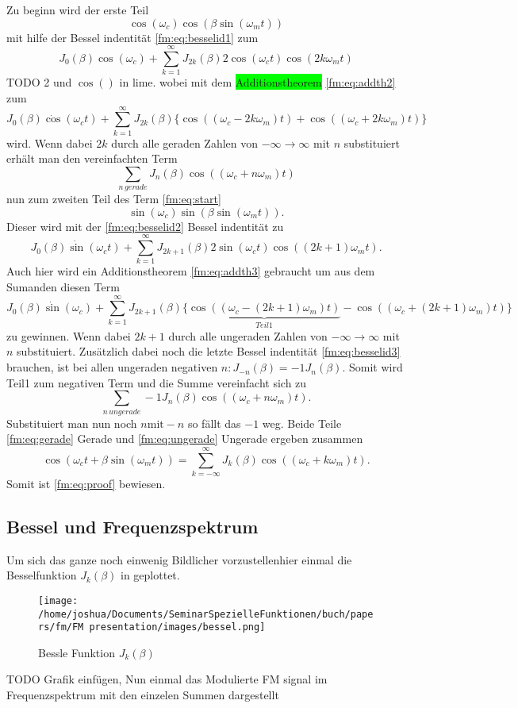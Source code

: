 Zu beginn wird der erste Teil 
\[
    \cos(\omega_c)\cos(\beta\sin(\omega_mt))  
\]
mit hilfe der Bessel indentität \ref{fm:eq:besselid1} zum
\[
    J_0(\beta)\cos(\omega_c) + \sum_{k=1}^\infty J_{2k}(\beta) 2\cos(\omega_c t)\cos(2k\omega_m t)
\]
\newline
TODO 2 und \(\cos( )\) in lime.
wobei mit dem \colorbox{lime}{Additionstheorem} \ref{fm:eq:addth2} zum
\[
    J_0(\beta)\dot \cos(\omega_c t) + \sum_{k=1}^\infty J_{2k}(\beta) \{ \cos((\omega_c - 2k\omega_m) t)+\cos((\omega_c + 2k\omega_m) t) \}
\]
wird.
Wenn dabei \(2k\) durch alle geraden Zahlen von \(-\infty \to \infty\) mit \(n\) substituiert erhält man den vereinfachten Term
\[
    \sum_{n\, gerade} J_{n}(\beta) \cos((\omega_c + n\omega_m) t)
    \label{fm:eq:gerade}
\]
\newline
nun zum zweiten Teil des Term \ref{fm:eq:start} 
\[
    \sin(\omega_c)\sin(\beta\sin(\omega_m t)).
\]
Dieser wird mit der \ref{fm:eq:besselid2} Bessel indentität zu
\[
    J_0(\beta) \dot \sin(\omega_c t) + \sum_{k=1}^\infty J_{2k+1}(\beta) 2\sin(\omega_c t)\cos((2k+1)\omega_m t).
\]
Auch hier wird ein Additionstheorem \ref{fm:eq:addth3} gebraucht um aus dem Sumanden diesen Term 
\[
    J_0(\beta) \dot \sin(\omega_c) + \sum_{k=1}^\infty J_{2k+1}(\beta) \{ \underbrace{\cos((\omega_c-(2k+1)\omega_m) t)}_{Teil1} - \cos((\omega_c+(2k+1)\omega_m) t) \}
\]zu gewinnen.
Wenn dabei \(2k +1\) durch alle ungeraden Zahlen von \(-\infty \to \infty\) mit \(n\) substituiert.
Zusätzlich dabei noch die letzte Bessel indentität \ref{fm:eq:besselid3} brauchen, ist bei allen ungeraden negativen \(n : J_{-n}(\beta) = -1 J_n(\beta)\).
Somit wird Teil1 zum negativen Term und die Summe vereinfacht sich zu
\[
     \sum_{n\, ungerade} -1 J_{n}(\beta) \cos((\omega_c + n\omega_m) t).
     \label{fm:eq:ungerade}
\]
Substituiert man nun noch \(n \text{mit} -n \) so fällt das \(-1\) weg.
Beide Teile \ref{fm:eq:gerade} Gerade und \ref{fm:eq:ungerade} Ungerade ergeben zusammen
\[
    \cos(\omega_ct+\beta\sin(\omega_mt))
    =
    \sum_{k= -\infty}^\infty J_{k}(\beta) \cos((\omega_c+k\omega_m)t).
\]
Somit ist \ref{fm:eq:proof} bewiesen.
\newpage
\subsection{Bessel und Frequenzspektrum}
Um sich das ganze noch einwenig Bildlicher vorzustellenhier einmal die Besselfunktion \(J_{k}(\beta)\) in geplottet.
\begin{figure}
	\centering
	\texttt{[image: /home/joshua/Documents/SeminarSpezielleFunktionen/buch/papers/fm/FM presentation/images/bessel.png]}
	\caption{Bessle Funktion \(J_{k}(\beta)\)}
	\label{fig:bessel}
\end{figure}
TODO Grafik einfügen,
\newline
Nun einmal das Modulierte FM signal im Frequenzspektrum mit den einzelen Summen dargestellt

